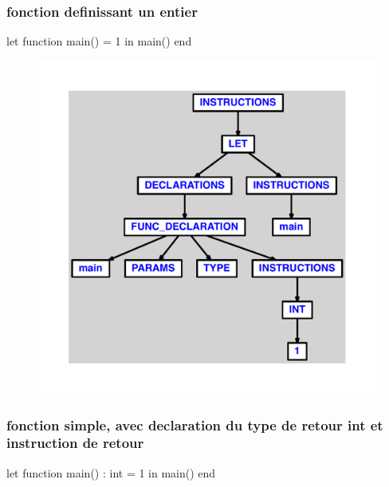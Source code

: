 \documentclass{article}
\begin{document}
\subsubsection{fonction definissant un entier}
\begin{verbatimtab}
let
	function main() = 1
in main() end
\end{verbatimtab}
\begin{figure}[H]\centering\includegraphics[max width=\textwidth]{ast/ast_221.pdf}\end{figure}\subsubsection{fonction simple, avec declaration du type de retour int et instruction de retour}
\begin{verbatimtab}
let
	function main() : int = 1
in main() end
\end{verbatimtab}
\end{document}
